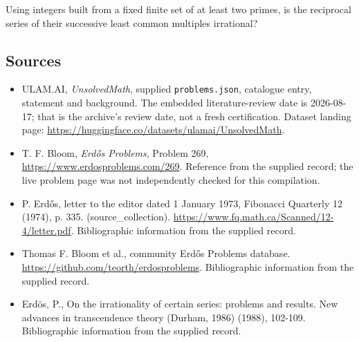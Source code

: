 \documentclass[11pt,a4paper]{article}
\begin{document}
Using integers built from a fixed finite set of at least two primes, is the reciprocal series of their successive least common multiples irrational?

\subsection{Sources}

{\small

\begin{itemize}

\item[\hypertarget{source:statement:1}{S1}] ULAM.AI, \emph{UnsolvedMath}, supplied \texttt{problems.json}, catalogue entry, statement and background. The embedded literature-review date is 2026-08-17; that is the archive’s review date, not a fresh certification. Dataset landing page: \url{https://huggingface.co/datasets/ulamai/UnsolvedMath}.

\item[\hypertarget{source:statement:2}{S2}] T. F. Bloom, \emph{Erdős Problems}, Problem 269, \url{https://www.erdosproblems.com/269}. Reference from the supplied record; the live problem page was not independently checked for this compilation.

\item[\hypertarget{source:statement:3}{S3}] P. Erdős, letter to the editor dated 1 January 1973, Fibonacci Quarterly 12 (1974), p. 335. (source\_collection). \url{https://www.fq.math.ca/Scanned/12-4/letter.pdf}. Bibliographic information from the supplied record.

\item[\hypertarget{source:statement:4}{S4}] Thomas F. Bloom et al., community Erdős Problems database. \url{https://github.com/teorth/erdosproblems}. Bibliographic information from the supplied record.

\item[\hypertarget{source:statement:5}{S5}] Erd\"{o}s, P., On the irrationality of certain series: problems and results. New advances in transcendence theory (Durham, 1986) (1988), 102-109. Bibliographic information from the supplied record.

\end{itemize}

}

\label{end:statement}
\end{document}
